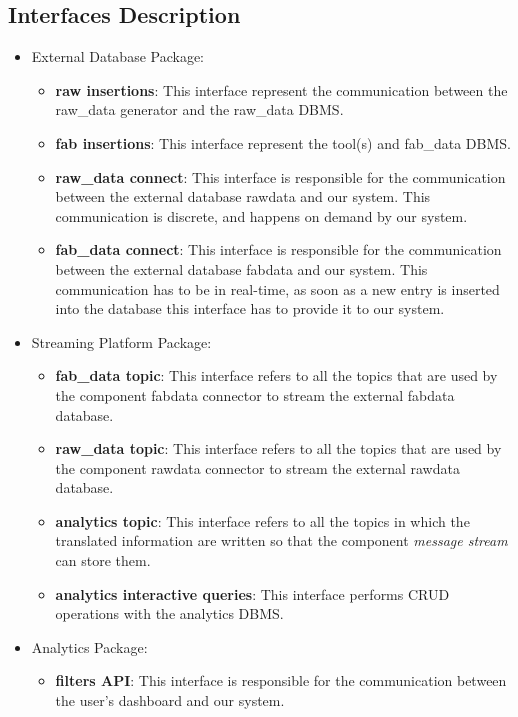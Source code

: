 \subsection{Interfaces Description}
\begin{itemize}
    \item External Database Package:
    \begin{itemize}
        \item \textbf{raw insertions}: This interface represent the communication between the raw\_data generator and the raw\_data DBMS. 
        \item \textbf{fab insertions}: This interface represent the tool(s) and fab\_data DBMS. 
        \item \textbf{raw\_data connect}: This interface is responsible for the communication between the external database raw\textunderscore data and our system. This communication is discrete, and happens on demand by our system.
        \item \textbf{fab\_data connect}: This interface is responsible for the communication between the external database fab\textunderscore data and our system. This communication has to be in real-time, as soon as a new entry is inserted into the database this interface has to provide it to our system.
    \end{itemize}
    \item Streaming Platform Package:
    \begin{itemize}
        \item \textbf{fab\_data topic}: This interface refers to all the topics that are used by the component fab\textunderscore data connector to stream the external fab\textunderscore data database.
        \item \textbf{raw\_data topic}: This interface refers to all the topics that are used by the component raw\textunderscore data connector to stream the external raw\textunderscore data database.
        \item \textbf{analytics topic}: This interface refers to all the topics in which the translated information are written so that the component \textit{message stream} can store them.
         \item \textbf{analytics interactive queries}: This interface performs CRUD operations with the analytics DBMS.
    \end{itemize}
    \item Analytics Package:
    \begin{itemize}
        \item \textbf{filters API}: This interface is responsible for the communication between the user's dashboard and our system.
    \end{itemize}
\end{itemize}

